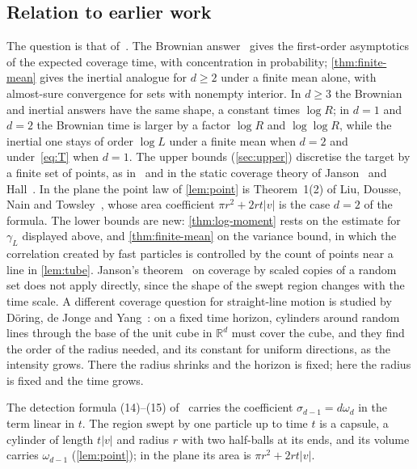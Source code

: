 \documentclass[11pt,a4paper]{article}
\numberwithin{equation}{section}
\theoremstyle{definition}
\theoremstyle{remark}
\newcommand{\abs}[1]{\lvert#1\rvert}
\begin{document}
\subsection{Relation to earlier work}
The question is that of~\cite{Kon14}. The Brownian answer~\cite{PSSS13} gives
the first-order asymptotics of the expected coverage time, with concentration
in probability;
\cref{thm:finite-mean} gives the inertial analogue for $d\ge2$ under a finite
mean alone, with almost-sure convergence for sets with nonempty interior. In
$d\ge3$ the Brownian and inertial answers have the same shape, a constant
times $\log R$; in $d=1$ and $d=2$ the Brownian time is larger by a factor
$\log R$ and $\log\log R$, while the inertial one stays of order $\log L$
under a finite mean when $d=2$ and under~\eqref{eq:T} when $d=1$. The upper
bounds (\cref{sec:upper}) discretise the target by a finite set of points, as
in~\cite{PSSS13} and in the static coverage theory of Janson~\cite{Jan86} and
Hall~\cite{Hal88}. In the plane the point law of \cref{lem:point} is
Theorem~1(2) of Liu, Dousse, Nain and Towsley~\cite{LDNT11}, whose area
coefficient $\pi r^2+2rt\abs v$ is the case $d=2$ of the formula. The lower
bounds are new: \cref{thm:log-moment} rests on the estimate for $\gamma_L$
displayed above, and \cref{thm:finite-mean} on the variance bound, in which
the correlation created by fast particles is controlled by the count of points
near a line in \cref{lem:tube}. Janson's theorem~\cite{Jan86} on coverage by
scaled copies of a random set does not apply directly, since the shape of the
swept region changes with the time scale. A different coverage question for
straight-line motion is studied by
D\"oring, de Jonge and Yang~\cite{DJY25}: on a fixed time horizon, cylinders
around random lines through the base of the unit cube in $\mathbb{R}^d$ must
cover the cube, and they find the order of the radius needed, and its
constant for uniform directions, as the intensity grows. There the radius
shrinks and the horizon is fixed; here the radius is fixed and the time
grows.

The detection formula (14)--(15) of~\cite{Kon14} carries the coefficient
$\sigma_{d-1}=d\omega_d$ in the term linear in $t$. The region swept by one
particle up to time $t$ is a capsule, a cylinder of length $t\abs v$ and
radius $r$ with two half-balls at its ends, and its volume carries
$\omega_{d-1}$ (\cref{lem:point}); in the plane its area is
$\pi r^2+2rt\abs v$.
\end{document}
